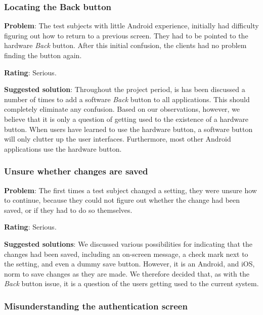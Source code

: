 \subsubsection{Locating the Back button}

\begin{description}
\item{\textbf{Problem}:} The test subjects with little Android experience, initially had difficulty figuring out how to return to a previous screen.
They had to be pointed to the hardware \textit{Back} button.
After this initial confusion, the clients had no problem finding the button again.
\item{\textbf{Rating}:} Serious.
\item{\textbf{Suggested solution}:} Throughout the project period, is has been discussed a number of times to add a software \textit{Back} button to all \giraf applications.
This should completely eliminate any confusion.
Based on our observations, however, we believe that it is only a question of getting used to the existence of a hardware button.
When users have learned to use the hardware button, a software button will only clutter up the user interfaces.
Furthermore, most other Android applications use the hardware button.
\end{description}

\subsubsection{Unsure whether changes are saved}

\begin{description}
\item{\textbf{Problem}:} The first times a test subject changed a setting, they were unsure how to continue, because they could not figure out whether the change had been saved, or if they had to do so themselves.
\item{\textbf{Rating}:} Serious.
\item{\textbf{Suggested solutions}:} We discussed various possibilities for indicating that the changes had been saved, including an on-screen message, a check mark next to the setting, and even a dummy save button.
However, it is an Android, and iOS, norm to save changes as they are made.
We therefore decided that, as with the \textit{Back} button issue, it is a question of the users getting used to the current system.
\end{description}

\subsubsection{Misunderstanding the authentication screen}


